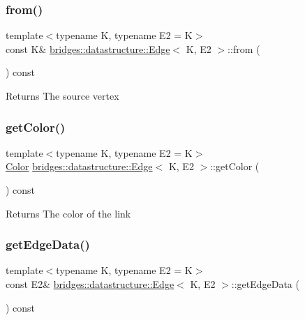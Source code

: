 \subsubsection{\texorpdfstring{from()}{from()}}
{\footnotesize\ttfamily template$<$typename K, typename E2 = K$>$ \\
const K\& \mbox{\hyperlink{classbridges_1_1datastructure_1_1_edge}{bridges\+::datastructure\+::\+Edge}}$<$ K, E2 $>$\+::from (\begin{DoxyParamCaption}{ }\end{DoxyParamCaption}) const\hspace{0.3cm}{\ttfamily [inline]}}

\begin{DoxyReturn}{Returns}
The source vertex 
\end{DoxyReturn}
\mbox{\label{classbridges_1_1datastructure_1_1_edge_abb5c66b734e1ac71e5d4e012908ec7a4}} 
\subsubsection{\texorpdfstring{getColor()}{getColor()}}
{\footnotesize\ttfamily template$<$typename K, typename E2 = K$>$ \\
\mbox{\hyperlink{classbridges_1_1datastructure_1_1_color}{Color}} \mbox{\hyperlink{classbridges_1_1datastructure_1_1_edge}{bridges\+::datastructure\+::\+Edge}}$<$ K, E2 $>$\+::get\+Color (\begin{DoxyParamCaption}{ }\end{DoxyParamCaption}) const\hspace{0.3cm}{\ttfamily [inline]}}

\begin{DoxyReturn}{Returns}
The color of the link 
\end{DoxyReturn}
\mbox{\label{classbridges_1_1datastructure_1_1_edge_a4769b5d8fc74522f77f5927b230ced7b}} 
\subsubsection{\texorpdfstring{getEdgeData()}{getEdgeData()}\hspace{0.1cm}{\footnotesize\ttfamily [1/2]}}
{\footnotesize\ttfamily template$<$typename K, typename E2 = K$>$ \\
const E2\& \mbox{\hyperlink{classbridges_1_1datastructure_1_1_edge}{bridges\+::datastructure\+::\+Edge}}$<$ K, E2 $>$\+::get\+Edge\+Data (\begin{DoxyParamCaption}{ }\end{DoxyParamCaption}) const\hspace{0.3cm}{\ttfamily [inline]}}

